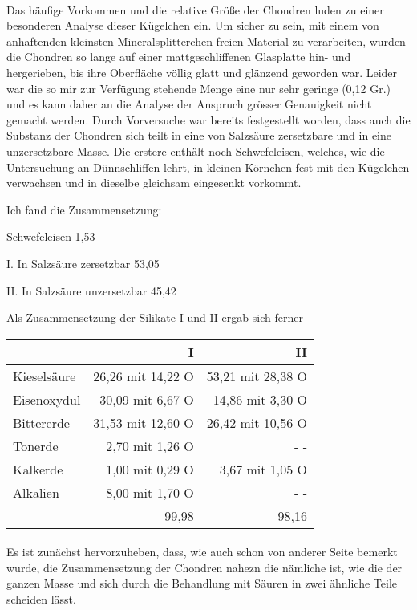 \documentclass[a4paper, 11pt, oneside]{article}
\begin{document}
\paragraph{}
Das häufige Vorkommen und die relative Größe der Chondren luden zu einer besonderen Analyse dieser Kügelchen ein. Um sicher zu sein, mit einem von anhaftenden kleinsten Mineralsplitterchen freien Material zu verarbeiten, wurden die Chondren so lange auf einer mattgeschliffenen Glasplatte hin- und hergerieben, bis ihre Oberfläche völlig glatt und glänzend geworden war. Leider war die so mir zur Verfügung stehende Menge eine nur sehr geringe (0,12 Gr.) und es kann daher an die Analyse der Anspruch grösser Genauigkeit nicht gemacht werden. Durch Vorversuche war bereits festgestellt worden, dass auch die Substanz der Chondren sich teilt in eine von Salzsäure zersetzbare und in eine unzersetzbare Masse. Die erstere enthält noch Schwefeleisen, welches, wie die Untersuchung an Dünnschliffen lehrt, in kleinen Körnchen fest mit den Kügelchen verwachsen und in dieselbe gleichsam eingesenkt vorkommt.

Ich fand die Zusammensetzung:

Schwefeleisen 1,53

I. In Salzsäure zersetzbar 53,05

II. In Salzsäure unzersetzbar 45,42

Als Zusammensetzung der Silikate I und II ergab sich ferner
\begin{center}
\begin{tabular}{ |l|r|r| }
    \hline
    & I & II\\
    \hline\hline
    Kieselsäure & 26,26 mit 14,22 O & 53,21 mit 28,38 O\\\hline
    Eisenoxydul & 30,09 mit 6,67 O & 14,86 mit 3,30 O\\\hline
    Bittererde & 31,53 mit 12,60 O & 26,42 mit 10,56 O\\\hline
    Tonerde & 2,70 mit 1,26 O & - -\\\hline
    Kalkerde & 1,00 mit 0,29 O & 3,67 mit 1,05 O\\\hline
    Alkalien & 8,00 mit 1,70 O & - -\\\hline
    & 99,98 & 98,16\\
    \hline
\end{tabular}
\end{center}
\paragraph{}
Es ist zunächst hervorzuheben, dass, wie auch schon von anderer Seite bemerkt wurde, die Zusammensetzung der Chondren nahezn die nämliche ist, wie die der ganzen Masse und sich durch die Behandlung mit Säuren in zwei ähnliche Teile scheiden lässt.
\end{document}
